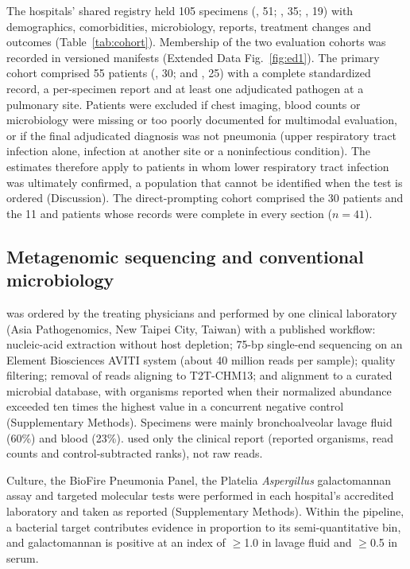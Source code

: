 The hospitals' shared registry held 105 \mngs specimens (\kmuh, 51; \tvgh, 35; \tsgh, 19) with demographics, comorbidities, microbiology, \mngs reports, treatment changes and outcomes (Table~\ref{tab:cohort}). Membership of the two evaluation cohorts was recorded in versioned manifests (Extended Data Fig.~\ref{fig:ed1}). The primary cohort comprised 55 patients (\kmuh, 30; \tvgh and \tsgh, 25) with a complete standardized record, a per-specimen \mngs report and at least one adjudicated pathogen at a pulmonary site. Patients were excluded if chest imaging, blood counts or microbiology were missing or too poorly documented for multimodal evaluation, or if the final adjudicated diagnosis was not pneumonia (upper respiratory tract infection alone, infection at another site or a noninfectious condition). The estimates therefore apply to patients in whom lower respiratory tract infection was ultimately confirmed, a population that cannot be identified when the test is ordered (Discussion).  The direct-prompting cohort comprised the 30 \kmuh patients and the 11 \tvgh and \tsgh patients whose records were complete in every section ($n=41$).

\subsection*{Metagenomic sequencing and conventional microbiology}
\mngs was ordered by the treating physicians and performed by one clinical laboratory (Asia Pathogenomics, New Taipei City, Taiwan) with a published workflow\cite{chou2025investigating,takahashi2026diagnostic}: nucleic-acid extraction without host depletion; 75-bp single-end sequencing on an Element Biosciences AVITI system (about 40 million reads per sample); quality filtering\cite{bolger2014trimmomatic,schmieder2011quality}; removal of reads aligning to T2T-CHM13\cite{nurk2022complete,li2013aligning}; and alignment to a curated microbial database, with organisms reported when their normalized abundance exceeded ten times the highest value in a concurrent negative control (Supplementary Methods). Specimens were mainly bronchoalveolar lavage fluid (60\%) and blood (23\%). \toolname used only the clinical report (reported organisms, read counts and control-subtracted ranks), not raw reads.

Culture, the BioFire \filmarray Pneumonia Panel\cite{buchan2020practical}, the Platelia \textit{Aspergillus} galactomannan assay\cite{hung2021investigating} and targeted molecular tests were performed in each hospital's accredited laboratory and taken as reported (Supplementary Methods). Within the pipeline, a \filmarray bacterial target contributes evidence in proportion to its semi-quantitative bin, and galactomannan is positive at an index of $\ge$1.0 in lavage fluid and $\ge$0.5 in serum\cite{donnelly2020revision}.

